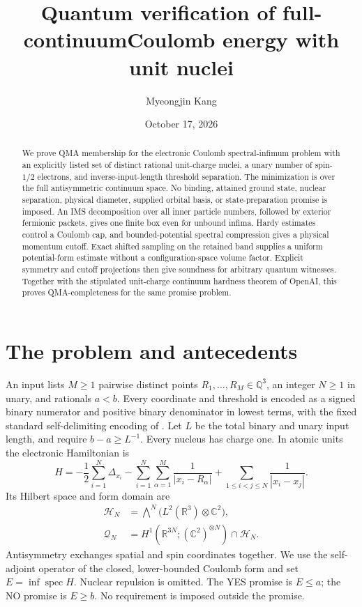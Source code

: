 \documentclass[11pt]{article}
\title{Quantum verification of full-continuum\newline Coulomb energy with unit nuclei}
\author{Myeongjin Kang}
\date{October 17, 2026}
\theoremstyle{remark}\newtheorem{remark}[theorem]{Remark}
\newcommand{\R}{\mathbb R}\newcommand{\C}{\mathbb C}\newcommand{\Q}{\mathbb Q}
\newcommand{\spec}{\operatorname{spec}}\newcommand{\Dom}{\operatorname{Dom}}
\numberwithin{equation}{section}
\begin{document}
\maketitle
\begin{abstract}
We prove QMA membership for the electronic Coulomb spectral-infimum problem
with an explicitly listed set of distinct rational unit-charge nuclei, a unary
number of spin-$1/2$ electrons, and inverse-input-length threshold separation.
The minimization is over the full antisymmetric continuum space. No binding,
attained ground state, nuclear separation, physical diameter, supplied orbital
basis, or state-preparation promise is imposed. An IMS decomposition over all
inner particle numbers, followed by exterior fermionic packets, gives one
finite box even for unbound infima. Hardy estimates control a Coulomb cap, and
bounded-potential spectral compression gives a physical momentum cutoff.
Exact shifted sampling on the retained band supplies a uniform potential-form
estimate without a configuration-space volume factor. Explicit symmetry and
cutoff projections then give soundness for arbitrary quantum witnesses.
Together with the stipulated unit-charge continuum hardness theorem of OpenAI,
this proves QMA-completeness for the same promise problem.
\end{abstract}

\section{The problem and antecedents}
\label{sec:statement}
An input lists $M\geq1$ pairwise distinct points
$R_1,\ldots,R_M\in\Q^3$, an integer $N\geq1$ in unary, and rationals $a<b$.
Every coordinate and threshold is encoded as a signed binary numerator and
positive binary denominator in lowest terms, with the fixed standard
self-delimiting encoding of \cite{unit}. Let $L$ be the total binary and unary
input length, and require $b-a\geq L^{-1}$. Every nucleus has charge one.
In atomic units the electronic Hamiltonian is
\begin{equation}\label{eq:H}
 H=-\frac12\sum_{i=1}^N\Delta_{x_i}
 -\sum_{i=1}^N\sum_{\alpha=1}^M\frac1{|x_i-R_\alpha|}
 +\sum_{1\leq i<j\leq N}\frac1{|x_i-x_j|}.
\end{equation}
Its Hilbert space and form domain are
\begin{align*}
 \mathcal H_N&=\bigwedge^N\bigl(L^2(\R^3)\otimes\C^2\bigr),\\
 \mathcal Q_N&=H^1(\R^{3N};(\C^2)^{\otimes N})\cap\mathcal H_N.
\end{align*}
Antisymmetry exchanges spatial and spin coordinates together. We use the
self-adjoint operator of the closed, lower-bounded Coulomb form and set
$E=\inf\spec H$. Nuclear repulsion is omitted. The YES promise is $E\leq a$;
the NO promise is $E\geq b$. No requirement is imposed outside the promise.
\end{document}
